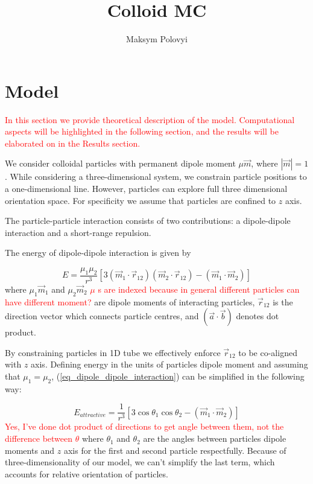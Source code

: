 \documentclass[12pt,a4paper]{article}
\author{Maksym Polovyi}
\title{Colloid MC}
\begin{document}
\section{Model}

\textcolor{red}{In this section we provide theoretical description of the model. Computational aspects will be highlighted in the following section, and the results will be elaborated on in the Results section.}

We consider colloidal particles with permanent dipole moment $\mu \vec{m}$, where $|\vec{m}| = 1$. While considering a three-dimensional system, we constrain particle positions to a one-dimensional line. However, particles can explore full three dimensional orientation space. For specificity we assume that particles are confined to $z$ axis.

The particle-particle interaction consists of two contributions: a dipole-dipole interaction and a short-range repulsion.

The energy of dipole-dipole interaction is given by

\label{eq_dipole_dipole_interaction}
\begin{equation}
E = \frac{\mu_1 \mu_2}{r^3}[3 (\vec{m}_1 \cdot \vec{r}_{12})(\vec{m}_2 \cdot \vec{r}_{12}) - (\vec{m}_1 \cdot \vec{m}_2)]
\end{equation}
where $\mu_1 \vec{m}_1$ and $\mu_2 \vec{m}_2$ \textcolor{red}{ $\mu$ s are indexed because in general different particles can have different moment?} are dipole moments of interacting particles, $\vec{r}_{12}$ is the direction vector which connects particle centres, and $(\vec{a} \cdot \vec{b})$ denotes dot product.

By constraining particles in 1D tube we effectively enforce $\vec{r}_{12}$ to be co-aligned with $z$ axis. Defining energy in the units of particles dipole moment and assuming that $\mu_1 = \mu_2$, (\ref{eq_dipole_dipole_interaction}) can be simplified in the following way:

\label{eq_dipole_dipole_1D}
\begin{equation}
E_{attractive} = \frac{1}{r^3} [3 \cos \theta_1 \cos \theta_2 - (\vec{m}_1 \cdot \vec{m}_2)]
\end{equation}
\textcolor{red}{Yes, I've done dot product of directions to get angle between them, not the difference between $\theta$}
where $\theta_1$ and $\theta_2$ are the angles between particles dipole moments and $z$ axis for the first and second particle respectfully. Because of three-dimensionality of our model, we can't simplify the last term, which accounts for relative orientation of particles.
\end{document}

